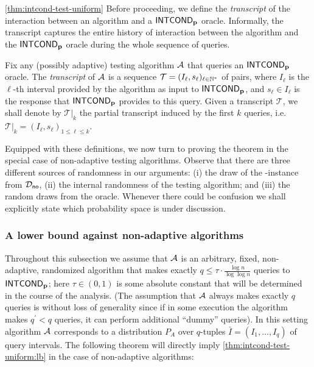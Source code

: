 \begin{proofof}{\cref{thm:intcond-test-uniform}}
Before proceeding, we define the \emph{transcript} of the interaction
between an algorithm and a ${\sf INTCOND}_{\mathbf{p}}$ oracle.
Informally, the transcript captures the entire history of
interaction between the algorithm and the ${\sf INTCOND}_{\mathbf{p}}$ oracle during the
whole sequence of queries.

\begin{definition}\label{def:transcript}

  Fix any (possibly adaptive) testing algorithm $\mathcal{A}$ that  queries an
${\sf INTCOND}_{\mathbf{p}}$ oracle. The \emph{transcript} of $\mathcal{A}$ is a sequence $\mathcal{T}=(I_\ell, s_\ell)_{\ell \in\mathbb{N}^\ast}$ of pairs,
where $I_\ell$ is the $\ell$-th interval provided by the
algorithm as input to ${\sf INTCOND}_{\mathbf{p}}$, and $s_\ell \in I_\ell$
is the response that ${\sf INTCOND}_{\mathbf{p}}$ provides to this query.
Given a transcript $\mathcal{T}$, we shall denote by
$\mathcal{T}|_k$ the partial transcript induced by the first $k$ queries, i.e.
$\mathcal{T}|_k=(I_\ell, s_\ell)_{1\leq \ell \leq k}$.

\end{definition}

Equipped with these definitions, we now turn to proving the theorem in
the special case of non-adaptive testing algorithms. Observe that there
are three different sources of randomness in our arguments: (i)
the draw of the \no-instance from $\mathcal{D}_{\textsf{no}}$, (ii) the
internal randomness of the testing algorithm; and (iii) the random draws
from the oracle. Whenever there could be confusion we shall
explicitly state which probability space is under discussion.

\subsubsection{A lower bound against non-adaptive algorithms}\label{sssec:unif-lb:intcond:non-adapt}


Throughout this subsection we assume that $\mathcal{A}$ is an arbitrary, fixed,
non-adaptive, randomized algorithm that makes exactly $q
\leq \tau \cdot {\frac {\log n}{\log \log n}}$ queries
to ${\sf INTCOND}_{\mathbf{p}}$; here 
$\tau \in (0,1)$
is some absolute constant
that will be determined in the course of the analysis.
(The assumption that $\mathcal{A}$ always makes exactly $q$ queries
is without loss of generality since if
in some execution the algorithm makes $q^\prime < q$ queries, it can
perform additional ``dummy'' queries).
In this setting algorithm $\mathcal{A}$ corresponds to a distribution $P_A$ over
$q$-tuples $\bar{I}= (I_1,\dots,I_q)$ of query intervals. 
The following theorem will directly imply
\cref{thm:intcond-test-uniform:lb} in the case of
non-adaptive algorithms:


\end{proofof}
